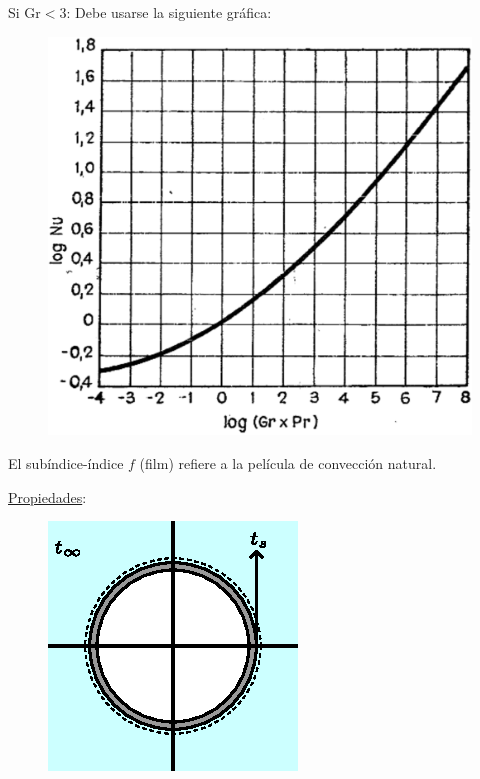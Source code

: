 Si $\text{Gr} < 3$: Debe usarse la siguiente gráfica:
\begin{figure}[!h]
\centering
\includegraphics[scale=0.40]{figura04_04.eps}
\end{figure}

El subíndice-índice $f$ (film) refiere a la película de convección natural.

\underline{Propiedades}:\\
\begin{figure}[!h]
\centering
\includegraphics[scale=1.40]{figura04_05.eps}
\end{figure}

